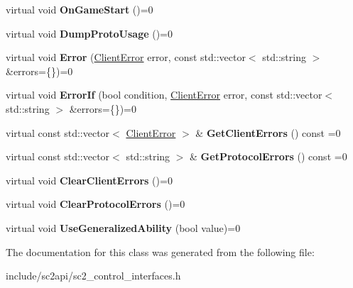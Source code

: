 \begin{DoxyCompactItemize}
virtual void {\bfseries On\+Game\+Start} ()=0
\item 
\mbox{\label{classsc2_1_1_control_interface_aac30977133be8ffe2a749a920149b5d3}} 
virtual void {\bfseries Dump\+Proto\+Usage} ()=0
\item 
\mbox{\label{classsc2_1_1_control_interface_ab3e7b964d0f7e90cc239e5997b09b5c4}} 
virtual void {\bfseries Error} (\hyperlink{sc2__client_8h_ac7d3e3694a208204e099f04c1e5eded0}{Client\+Error} error, const std\+::vector$<$ std\+::string $>$ \&errors=\{\})=0
\item 
\mbox{\label{classsc2_1_1_control_interface_a0f3a503c5e2ed951eed1774866a0280f}} 
virtual void {\bfseries Error\+If} (bool condition, \hyperlink{sc2__client_8h_ac7d3e3694a208204e099f04c1e5eded0}{Client\+Error} error, const std\+::vector$<$ std\+::string $>$ \&errors=\{\})=0
\item 
\mbox{\label{classsc2_1_1_control_interface_ac033fdc8fb4d4aa50a174b6d8870a143}} 
virtual const std\+::vector$<$ \hyperlink{sc2__client_8h_ac7d3e3694a208204e099f04c1e5eded0}{Client\+Error} $>$ \& {\bfseries Get\+Client\+Errors} () const =0
\item 
\mbox{\label{classsc2_1_1_control_interface_ac26497e85a0dc55ae82270f0f50d5f03}} 
virtual const std\+::vector$<$ std\+::string $>$ \& {\bfseries Get\+Protocol\+Errors} () const =0
\item 
\mbox{\label{classsc2_1_1_control_interface_a8873d48c9aea76578115f4d5d1fbdbf5}} 
virtual void {\bfseries Clear\+Client\+Errors} ()=0
\item 
\mbox{\label{classsc2_1_1_control_interface_a0b7042768e8b428f867b9069281e8c66}} 
virtual void {\bfseries Clear\+Protocol\+Errors} ()=0
\item 
\mbox{\label{classsc2_1_1_control_interface_ae1a7f651dbd994f99d75fb6315b5c688}} 
virtual void {\bfseries Use\+Generalized\+Ability} (bool value)=0
\end{DoxyCompactItemize}


The documentation for this class was generated from the following file\+:\begin{DoxyCompactItemize}
\item 
include/sc2api/sc2\+\_\+control\+\_\+interfaces.\+h\end{DoxyCompactItemize}
